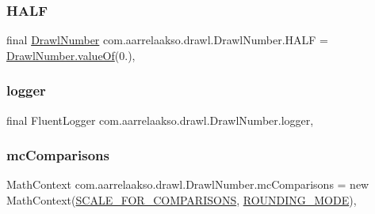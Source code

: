 \subsubsection{\texorpdfstring{H\+A\+LF}{HALF}}
{\footnotesize\ttfamily final \hyperlink{classcom_1_1aarrelaakso_1_1drawl_1_1_drawl_number}{Drawl\+Number} com.\+aarrelaakso.\+drawl.\+Drawl\+Number.\+H\+A\+LF = \hyperlink{classcom_1_1aarrelaakso_1_1drawl_1_1_drawl_number_a3fd17115c85e2bfc9e881838a3f7d735}{Drawl\+Number.\+value\+Of}(0.)\hspace{0.3cm}{\ttfamily [static]}, {\ttfamily [protected]}}

\mbox{\label{classcom_1_1aarrelaakso_1_1drawl_1_1_drawl_number_ad2eb8e8b4021e0d474b39f06e81ff9e7}} 
\subsubsection{\texorpdfstring{logger}{logger}}
{\footnotesize\ttfamily final Fluent\+Logger com.\+aarrelaakso.\+drawl.\+Drawl\+Number.\+logger\hspace{0.3cm}{\ttfamily [static]}, {\ttfamily [private]}}

\mbox{\label{classcom_1_1aarrelaakso_1_1drawl_1_1_drawl_number_a520b230ee4ceb0e1bef368ace676a954}} 
\subsubsection{\texorpdfstring{mc\+Comparisons}{mcComparisons}}
{\footnotesize\ttfamily Math\+Context com.\+aarrelaakso.\+drawl.\+Drawl\+Number.\+mc\+Comparisons = new Math\+Context(\hyperlink{classcom_1_1aarrelaakso_1_1drawl_1_1_drawl_number_ace1cb62d1ecce8212578d1a13cf5cbc4}{S\+C\+A\+L\+E\+\_\+\+F\+O\+R\+\_\+\+C\+O\+M\+P\+A\+R\+I\+S\+O\+NS}, \hyperlink{classcom_1_1aarrelaakso_1_1drawl_1_1_drawl_number_ab4b44bb0675da90d8f435286911b711e}{R\+O\+U\+N\+D\+I\+N\+G\+\_\+\+M\+O\+DE})\hspace{0.3cm}{\ttfamily [static]}, {\ttfamily [protected]}}



